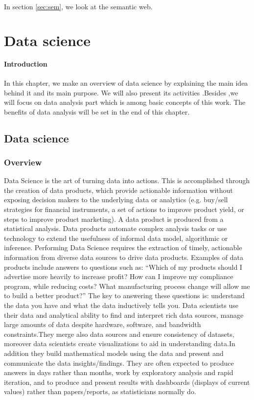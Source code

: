 \documentclass[a4paper,12pt,oneside]{report}
\begin{document}
In section \ref{sec:sem}, we look at the semantic web.

\chapter{Data science}
\textbf{\large Introduction}\\ \\
{In this chapter, we make an overview of data science by explaining the main idea behind it and its main purpose. We will also  present its activities .Besides ,we will focus  on data analysis part  which is among basic concepts of this work. The benefits of data analysis will be set in the end of this chapter.}
\section{Data science}
\subsection{Overview}
{  Data Science is the art of turning data into actions. This is accomplished through the creation of data products, which provide actionable information without exposing decision makers to the underlying data or analytics (e.g. buy/sell strategies for financial instruments, a set of actions to improve product yield, or steps to improve product marketing). A data product is produced from a statistical analysis. Data products automate complex analysis tasks or use technology to extend the usefulness of informal data model, algorithmic or inference.
Performing Data Science requires the extraction of timely, actionable information from diverse data sources to drive data products.
Examples of data products include answers to questions such as:
“Which of my products should I advertise more heavily to increase profit? How can I improve my compliance program, while reducing costs? What manufacturing process change will allow me to build a better product?” The key to answering these questions is: understand the data you have and what the data inductively tells you.
Data scientists use their data and analytical ability to find and interpret rich data sources, manage large amounts of data despite hardware, software, and bandwidth constraints.They merge also data sources and ensure consistency of datasets, moreover data scientists  create visualizations to aid in understanding data.In addition they build mathematical models using the data and present and communicate the data insights/findings. They are often expected to produce answers in days rather than months, work by exploratory analysis and rapid iteration, and to produce and present results with dashboards (displays of current values) rather than papers/reports, as statisticians normally do.}
\end{document}
